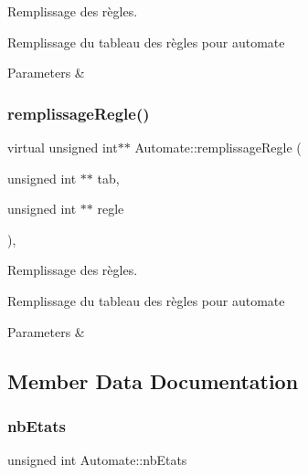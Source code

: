 Remplissage des règles. 

Remplissage du tableau des règles pour automate


\begin{DoxyParams}{Parameters}
{\em } & \\
\hline
\end{DoxyParams}
\mbox{\label{class_automate_ad812bbe51c6e5708e5f66094cbf83fe7}} 
\subsubsection{\texorpdfstring{remplissage\+Regle()}{remplissageRegle()}\hspace{0.1cm}{\footnotesize\ttfamily [2/2]}}
{\footnotesize\ttfamily virtual unsigned int$\ast$$\ast$ Automate\+::remplissage\+Regle (\begin{DoxyParamCaption}\item[{unsigned int $\ast$$\ast$}]{tab,  }\item[{unsigned int $\ast$$\ast$}]{regle }\end{DoxyParamCaption})\hspace{0.3cm}{\ttfamily [protected]}, {}}



Remplissage des règles. 

Remplissage du tableau des règles pour automate


\begin{DoxyParams}{Parameters}
{\em } & \\
\hline
\end{DoxyParams}


\subsection{Member Data Documentation}
\mbox{\label{class_automate_a45d7a7416a08f736c2e9f12e63c6e7c5}} 
\subsubsection{\texorpdfstring{nb\+Etats}{nbEtats}}
{\footnotesize\ttfamily unsigned int Automate\+::nb\+Etats\hspace{0.3cm}{\ttfamily [protected]}}

